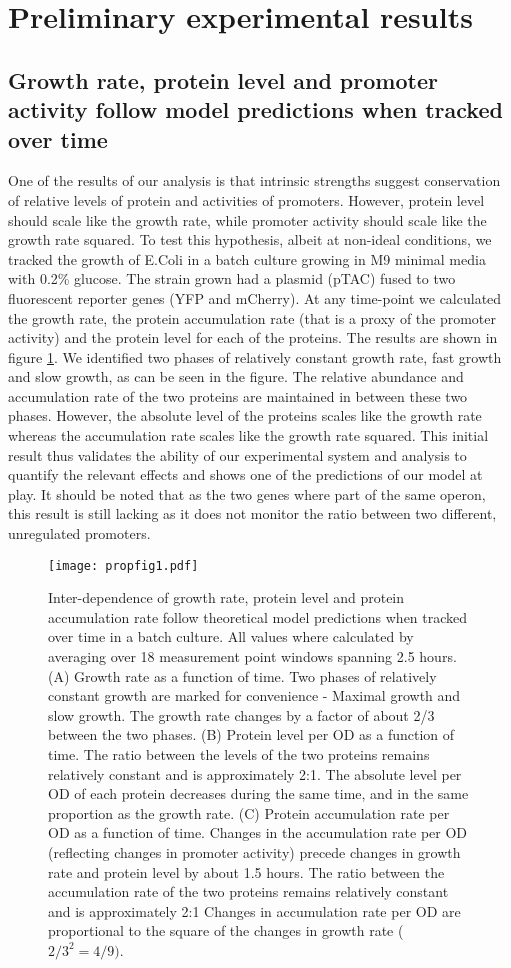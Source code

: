 \documentclass[a4page,notitlepage]{article}
\begin{document}
\section{Preliminary experimental results}
\subsection{Growth rate, protein level and promoter activity follow model predictions when tracked over time}
One of the results of our analysis is that intrinsic strengths suggest conservation of relative levels of protein and activities of promoters.
However, protein level should scale like the growth rate, while promoter activity should scale like the growth rate squared.
To test this hypothesis, albeit at non-ideal conditions, we tracked the growth of E.Coli in a batch culture growing in M9 minimal media with 0.2\% glucose.
The strain grown had a plasmid (pTAC) fused to two fluorescent reporter genes (YFP and mCherry).
At any time-point we calculated the growth rate, the protein accumulation rate (that is a proxy of the promoter activity) and the protein level for each of the proteins.
The results are shown in figure \ref{time-gr-fig}.
We identified two phases of relatively constant growth rate, fast growth and slow growth, as can be seen in the figure.
The relative abundance and accumulation rate of the two proteins are maintained in between these two phases.
However, the absolute level of the proteins scales like the growth rate whereas the accumulation rate scales like the growth rate squared.
This initial result thus validates the ability of our experimental system and analysis to quantify the relevant effects and shows one of the predictions of our model at play.
It should be noted that as the two genes where part of the same operon, this result is still lacking as it does not monitor the ratio between two different, unregulated promoters.
\begin{figure}[h]
\texttt{[image: propfig1.pdf]}
\caption{Inter-dependence of growth rate, protein level and protein accumulation rate follow theoretical model predictions when tracked over time in a batch culture.
All values where calculated by averaging over 18 measurement point windows spanning 2.5 hours.
(A) Growth rate as a function of time.
Two phases of relatively constant growth are marked for convenience - Maximal growth and slow growth.
The growth rate changes by a factor of about 2/3 between the two phases.
(B) Protein level per OD as a function of time.
The ratio between the levels of the two proteins remains relatively constant and is approximately 2:1.
The absolute level per OD of each protein decreases during the same time, and in the same proportion as the growth rate.
(C) Protein accumulation rate per OD as a function of time.
Changes in the accumulation rate per OD (reflecting changes in promoter activity) precede changes in growth rate and protein level by about 1.5 hours.
The ratio between the accumulation rate of the two proteins remains relatively constant and is approximately 2:1
Changes in accumulation rate per OD are proportional to the square of the changes in growth rate ($2/3^2=4/9)$.}
\label{time-gr-fig}
\end{figure}
\end{document}
